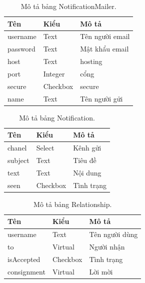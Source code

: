 \documentclass[11pt]{report}
\begin{document}
	\begin{table}[h!]
		\begin{center}
			\caption{Mô tả bảng NotificationMailer.}
			\begin{tabular}{ |l|l|l| } 
				\hline
				Tên & Kiểu & Mô tả \\
				\hline
				username & Text & Tên người email \\
				password & Text & Mật khẩu email \\
				host & Text & hosting \\
				port & Integer & cổng \\
				secure & Checkbox & secure \\
				name & Text & Tên người gửi \\ 
				\hline
			\end{tabular}
			\label{table:NotificationMailer}
		\end{center}
	\end{table}
	
	
	\begin{table}[h!]
		\begin{center}
			\caption{Mô tả bảng Notification.}
			\begin{tabular}{ |l|l|l| } 
				\hline
				Tên & Kiểu & Mô tả \\
				\hline
				chanel & Select & Kênh gửi \\
				subject & Text & Tiêu đề \\
				text & Text & Nội dung \\
				seen & Checkbox & Tình trạng \\ 
				\hline
			\end{tabular}
			\label{table:Notification}
		\end{center}
	\end{table}
	
	
	\begin{table}[h!]
		\begin{center}
			\caption{Mô tả bảng Relationship.}
			\begin{tabular}{ |l|l|l| } 
				\hline
				Tên & Kiểu & Mô tả \\
				\hline
				username & Text & Tên người dùng \\
				to & Virtual & Người nhận \\
				isAccepted & Checkbox & Tình trạng \\
				consignment & Virtual & Lời mời \\ 
				\hline
			\end{tabular}
			\label{table:Relationship}
		\end{center}
	\end{table}
	
\end{document}
